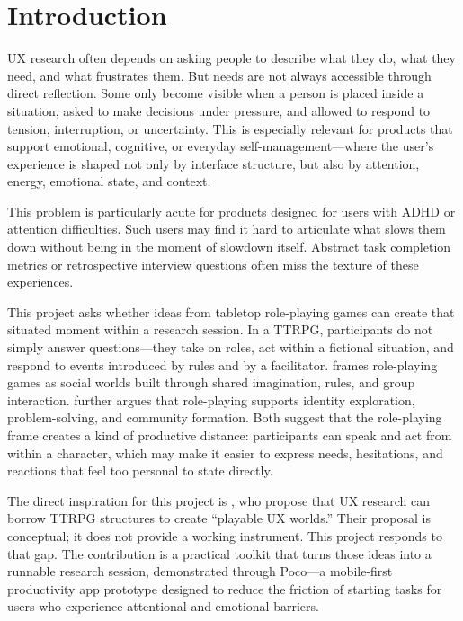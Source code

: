 \documentclass[12pt,a4paper]{report}
\begin{document}
\clearpage
\tableofcontents
\clearpage


\chapter{Introduction}

UX research often depends on asking people to describe what they do, what they need,
and what frustrates them.
But needs are not always accessible through direct reflection.
Some only become visible when a person is placed inside a situation, asked to make
decisions under pressure, and allowed to respond to tension, interruption, or
uncertainty.
This is especially relevant for products that support emotional, cognitive, or everyday
self-management---where the user's experience is shaped not only by interface structure,
but also by attention, energy, emotional state, and context.

This problem is particularly acute for products designed for users with ADHD or
attention difficulties.
Such users may find it hard to articulate what slows them down without being in the
moment of slowdown itself.
Abstract task completion metrics or retrospective interview questions often miss the
texture of these experiences.

This project asks whether ideas from tabletop role-playing games can create that situated
moment within a research session.
In a TTRPG, participants do not simply answer questions---they take on roles, act within
a fictional situation, and respond to events introduced by rules and by a facilitator.
\citet{fine1983shared} frames role-playing games as social worlds built through shared
imagination, rules, and group interaction.
\citet{bowman2010functions} further argues that role-playing supports identity
exploration, problem-solving, and community formation.
Both suggest that the role-playing frame creates a kind of productive distance:
participants can speak and act from within a character, which may make it easier to
express needs, hesitations, and reactions that feel too personal to state directly.

The direct inspiration for this project is \citet{sturdee2023ttrpg}, who propose that
UX research can borrow TTRPG structures to create ``playable UX worlds.''
Their proposal is conceptual; it does not provide a working instrument.
This project responds to that gap.
The contribution is a practical toolkit that turns those ideas into a runnable research
session, demonstrated through Poco---a mobile-first productivity app prototype designed
to reduce the friction of starting tasks for users who experience attentional and
emotional barriers.
\end{document}
